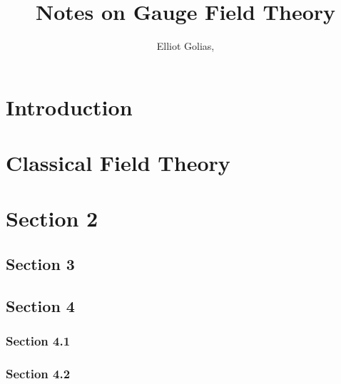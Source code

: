 \documentclass[a4paper,11pt]{article}
\title{\boldmath Notes on Gauge Field Theory}
\author{Elliot Golias,\note{Corresponding author.}}
\begin{document}
 
\maketitle
\flushbottom

\section{Introduction}
\label{sec:intro}


\section{Classical Field Theory}
\label{sec:classical-field-theory}


\section{Section 2}
\label{sec:cointegration}


\subsection{Section 3}


\subsection{Section 4}


\subsubsection{Section 4.1}


\subsubsection{Section 4.2}


\end{document}
